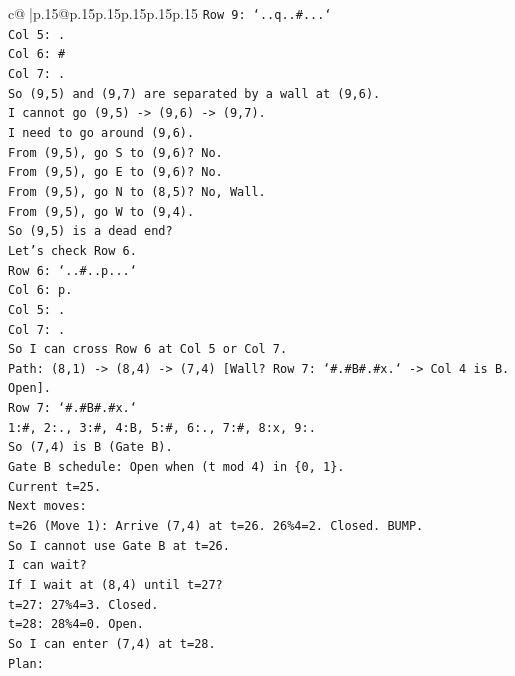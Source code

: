 \documentclass{article}
\begin{document}
{\begin{supertabular}{c@{$\;$}|p{.15\linewidth}@{}p{.15\linewidth}p{.15\linewidth}p{.15\linewidth}p{.15\linewidth}p{.15\linewidth}}
{{{\texttt{Row 9: `..q..\#...`} \\
\texttt{Col 5: .} \\
\texttt{Col 6: \#} \\
\texttt{Col 7: .} \\
\texttt{So (9,5) and (9,7) are separated by a wall at (9,6).} \\
\texttt{I cannot go (9,5) {-}> (9,6) {-}> (9,7).} \\
\texttt{I need to go around (9,6).} \\
\texttt{From (9,5), go S to (9,6)? No.} \\
\texttt{From (9,5), go E to (9,6)? No.} \\
\texttt{From (9,5), go N to (8,5)? No, Wall.} \\
\texttt{From (9,5), go W to (9,4).} \\
\texttt{So (9,5) is a dead end?} \\
\texttt{Let's check Row 6.} \\
\texttt{Row 6: `..\#..p...`} \\
\texttt{Col 6: p.} \\
\texttt{Col 5: .} \\
\texttt{Col 7: .} \\
\texttt{So I can cross Row 6 at Col 5 or Col 7.} \\
\texttt{Path: (8,1) {-}> (8,4) {-}> (7,4) {[}Wall? Row 7: `\#.\#B\#.\#x.` {-}> Col 4 is B. Open{]}.} \\
\texttt{Row 7: `\#.\#B\#.\#x.`} \\
\texttt{1:\#, 2:., 3:\#, 4:B, 5:\#, 6:., 7:\#, 8:x, 9:.} \\
\texttt{So (7,4) is B (Gate B).} \\
\texttt{Gate B schedule: Open when (t mod 4) in \{0, 1\}.} \\
\texttt{Current t=25.} \\
\texttt{Next moves:} \\
\texttt{t=26 (Move 1): Arrive (7,4) at t=26. 26\%4=2. Closed. BUMP.} \\
\texttt{So I cannot use Gate B at t=26.} \\
\texttt{I can wait?} \\
\texttt{If I wait at (8,4) until t=27?} \\
\texttt{t=27: 27\%4=3. Closed.} \\
\texttt{t=28: 28\%4=0. Open.} \\
\texttt{So I can enter (7,4) at t=28.} \\
\texttt{Plan:} \\
}}}
\end{supertabular}}
\end{document}

